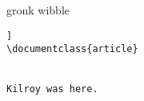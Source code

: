 gronk wibble

\begin{lstlisting}[language=TeX[LaTeX]]
\documentclass{article}


Kilroy was here.

\end{lstlisting}

